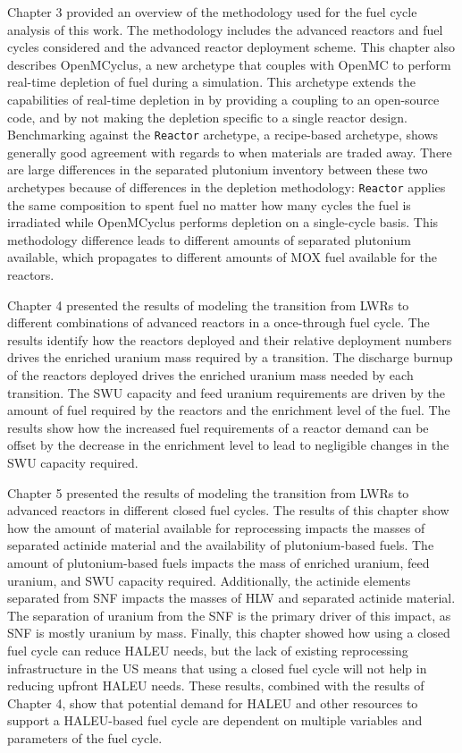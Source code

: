 Chapter 3 provided an overview of the methodology used for the fuel 
cycle analysis of this work. The methodology includes the 
advanced reactors and fuel cycles considered and the 
advanced reactor deployment scheme. This chapter also 
describes OpenMCyclus, a new archetype that couples \Cyclus with 
OpenMC to perform real-time depletion of fuel during a simulation. 
This archetype extends the capabilities of real-time depletion in 
\Cyclus by providing a coupling to an open-source code, and by 
not making the depletion specific to a single reactor design. 
Benchmarking against the \Cycamore \texttt{Reactor} archetype, 
a recipe-based archetype, shows generally good agreement with 
regards to when materials are traded away. There 
are large differences in the separated plutonium inventory between 
these two archetypes because of differences in the 
depletion methodology: \Cycamore \texttt{Reactor} applies the 
same composition to spent fuel no matter how many cycles the 
fuel is irradiated while OpenMCyclus performs depletion on a 
single-cycle basis. This methodology difference leads to different 
amounts of separated plutonium available, which propagates 
to different amounts of \gls{MOX} fuel available for the 
reactors. 

Chapter 4 presented the results of modeling the transition from 
\glspl{LWR} to different combinations of advanced reactors in 
a once-through fuel cycle. 
The results identify how 
the reactors deployed and their relative deployment numbers drives 
the enriched uranium mass required by a transition. The discharge
burnup of the reactors deployed drives the enriched uranium 
mass needed by each transition. The \gls{SWU} capacity and 
feed uranium requirements are driven by the amount of fuel required 
by the reactors and the enrichment level of the fuel. The results 
show how the increased fuel requirements of a reactor demand can 
be offset by the decrease in the enrichment level to lead to 
negligible changes in the \gls{SWU} capacity required. 

Chapter 5 presented the results of modeling the transition from 
\glspl{LWR} to advanced reactors in different closed fuel cycles. 
The results of this chapter show how the amount of material 
available for reprocessing impacts the masses of separated 
actinide material and the availability of plutonium-based 
fuels. The amount of plutonium-based fuels impacts the 
mass of enriched uranium, feed uranium, and \gls{SWU} 
capacity required. Additionally, the actinide elements 
separated from \gls{SNF} impacts the masses of \gls{HLW} and separated 
actinide material. The separation of uranium from the 
\gls{SNF} is the primary driver of this impact, as 
\gls{SNF} is mostly uranium by mass. Finally, this chapter 
showed how using a closed fuel cycle can reduce \gls{HALEU} 
needs, but the lack of existing reprocessing infrastructure 
in the US means that using a closed fuel cycle will not help 
in reducing upfront \gls{HALEU} needs. 
These results, combined 
with the results of Chapter 4, show that potential demand for 
\gls{HALEU} and other resources to support a \gls{HALEU}-based 
fuel cycle are dependent on multiple variables and parameters 
of the fuel cycle. 


